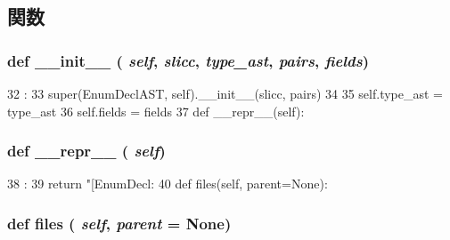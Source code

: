 \subsection{関数}
\hypertarget{classslicc_1_1ast_1_1EnumDeclAST_1_1EnumDeclAST_ac775ee34451fdfa742b318538164070e}{
\subsubsection[{\_\-\_\-init\_\-\_\-}]{\setlength{\rightskip}{0pt plus 5cm}def \_\-\_\-init\_\-\_\- ( {\em self}, \/   {\em slicc}, \/   {\em type\_\-ast}, \/   {\em pairs}, \/   {\em fields})}}
\label{classslicc_1_1ast_1_1EnumDeclAST_1_1EnumDeclAST_ac775ee34451fdfa742b318538164070e}



\begin{DoxyCode}
32                                                       :
33         super(EnumDeclAST, self).__init__(slicc, pairs)
34 
35         self.type_ast = type_ast
36         self.fields = fields
37 
    def __repr__(self):
\end{DoxyCode}
\hypertarget{classslicc_1_1ast_1_1EnumDeclAST_1_1EnumDeclAST_ad8b9328939df072e4740cd9a63189744}{
\subsubsection[{\_\-\_\-repr\_\-\_\-}]{\setlength{\rightskip}{0pt plus 5cm}def \_\-\_\-repr\_\-\_\- ( {\em self})}}
\label{classslicc_1_1ast_1_1EnumDeclAST_1_1EnumDeclAST_ad8b9328939df072e4740cd9a63189744}



\begin{DoxyCode}
38                       :
39         return "[EnumDecl: %
40 
    def files(self, parent=None):
\end{DoxyCode}
\hypertarget{classslicc_1_1ast_1_1EnumDeclAST_1_1EnumDeclAST_a35b1a87f6fcbddeb5b793b0e415765f8}{
\subsubsection[{files}]{\setlength{\rightskip}{0pt plus 5cm}def files ( {\em self}, \/   {\em parent} = {\ttfamily None})}}
\label{classslicc_1_1ast_1_1EnumDeclAST_1_1EnumDeclAST_a35b1a87f6fcbddeb5b793b0e415765f8}


